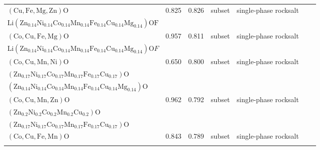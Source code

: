 \begin{table}
{\begin{tabular}{lcccccr}
$(\mathrm{Cu},\mathrm{Fe},\mathrm{Mg},\mathrm{Zn})\mathrm{O}$ & 0.825 & 0.826 & subset & single-phase rocksalt & \makecell{$(\mathrm{Zn}_{0.14}\mathrm{Ni}_{0.14}\mathrm{Co}_{0.14}\mathrm{Mn}_{0.14}\mathrm{Fe}_{0.14}\mathrm{Cu}_{0.14}\mathrm{Mg}_{0.14})\mathrm{O}$\\
$\mathrm{Li}(\mathrm{Zn}_{0.14}\mathrm{Ni}_{0.14}\mathrm{Co}_{0.14}\mathrm{Mn}_{0.14}\mathrm{Fe}_{0.14}\mathrm{Cu}_{0.14}\mathrm{Mg}_{0.14})\mathrm{OF}$} & ~\cite{Lin_MechanochemicalSynthesis_JournalofMaterialsScience_2020} \\
$(\mathrm{Co},\mathrm{Cu},\mathrm{Fe},\mathrm{Mg})\mathrm{O}$ & 0.957 & 0.811 & subset & single-phase rocksalt & \makecell{$(\mathrm{Zn}_{0.14}\mathrm{Ni}_{0.14}\mathrm{Co}_{0.14}\mathrm{Mn}_{0.14}\mathrm{Fe}_{0.14}\mathrm{Cu}_{0.14}\mathrm{Mg}_{0.14})\mathrm{O}$\\
$\mathrm{Li}(\mathrm{Zn}_{0.14}\mathrm{Ni}_{0.14}\mathrm{Co}_{0.14}\mathrm{Mn}_{0.14}\mathrm{Fe}_{0.14}\mathrm{Cu}_{0.14}\mathrm{Mg}_{0.14})\mathrm{O}F$} & ~\cite{Lin_MechanochemicalSynthesis_JournalofMaterialsScience_2020} \\
$(\mathrm{Co},\mathrm{Cu},\mathrm{Mn},\mathrm{Ni})\mathrm{O}$ & 0.650 & 0.800 & subset & single-phase rocksalt & \makecell{$(\mathrm{Zn}_{0.2}\mathrm{Ni}_{0.2}\mathrm{Co}_{0.2}\mathrm{Mn}_{0.2}\mathrm{Cu}_{0.2})\mathrm{O}$\\
$(\mathrm{Zn}_{0.17}\mathrm{Ni}_{0.17}\mathrm{Co}_{0.17}\mathrm{Mn}_{0.17}\mathrm{Fe}_{0.17}\mathrm{Cu}_{0.17})\mathrm{O}$\\
$(\mathrm{Zn}_{0.14}\mathrm{Ni}_{0.14}\mathrm{Co}_{0.14}\mathrm{Mn}_{0.14}\mathrm{Fe}_{0.14}\mathrm{Cu}_{0.14}\mathrm{Mg}_{0.14})\mathrm{O}$} & ~\cite{Lin_MechanochemicalSynthesis_JournalofMaterialsScience_2020,Wang_HighEntropyLayered_CrystalGrowthDesign_2022} \\
$(\mathrm{Co},\mathrm{Cu},\mathrm{Mn},\mathrm{Zn})\mathrm{O}$ & 0.962 & 0.792 & subset & single-phase rocksalt & \makecell{$\mathrm{Li}_{0.3}(\mathrm{Co},\mathrm{Cu},\mathrm{Mg},\mathrm{Mn},\mathrm{Zn})\mathrm{O}$\\
$(\mathrm{Zn}_{0.2}\mathrm{Ni}_{0.2}\mathrm{Co}_{0.2}\mathrm{Mn}_{0.2}\mathrm{Cu}_{0.2})\mathrm{O}$\\ $(\mathrm{Zn}_{0.17}\mathrm{Ni}_{0.17}\mathrm{Co}_{0.17}\mathrm{Mn}_{0.17}\mathrm{Fe}_{0.17}\mathrm{Cu}_{0.17})\mathrm{O}$} & ~\cite{Biesuz_NifreeHighentropy_JournalOfMaterialsChemistryA_2022,Lin_MechanochemicalSynthesis_JournalofMaterialsScience_2020} \\
$(\mathrm{Co},\mathrm{Cu},\mathrm{Fe},\mathrm{Mn})\mathrm{O}$ & 0.843 & 0.789 & subset & single-phase rocksalt & \makecell{$(\mathrm{Zn}_{0.17}\mathrm{Ni}_{0.17}\mathrm{Co}_{0.17}\mathrm{Mn}_{0.17}\mathrm{Fe}_{0.17}\mathrm{Cu}_{0.17})\mathrm{O}$\\
}
\end{tabular}}
\end{table}
